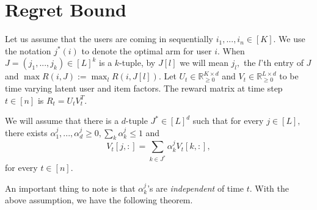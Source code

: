 \newcommand\myworries[1]{\textcolor{red}{#1}}

\section{Regret Bound}
Let us assume that the users are coming in sequentially $i_1,...,i_n \in [K].$ We use the notation $j^*(i)$ to denote the optimal arm for user $i$. When $J =(j_1,...,j_k) \in [L]^k$ is a $k$-tuple, by $J[l]$ we will mean $j_l,$ the $l$'th entry of $J$ and  $\max R(i, J) := \max_l R(i,J[l]).$ %
Let $U_t \in \mathbb{R}_{\geq 0}^{K \times d}$ and $V_t \in \mathbb{R}_{\geq 0}^{L \times d}$ to be time varying latent user and item factors.
 The reward matrix at time step $t \in [n]$ is $R_t = U_t V_t^T.$
\begin{assumption}
We will assume that there is a $d$-tuple $J^{*} \in [L]^d$ such that for every  $j \in [L],$ there exists $\alpha_1^j,...,\alpha_d^j \geq 0, \sum_k \alpha_k^j \leq 1$ and
$$ V_t[j,:] = \sum_{k \in J^*} \alpha_k^j V_t[k,:], $$
for every $t \in [n]$.
\end{assumption}
 An important thing to note is that $\alpha_k^j$'s are {\it independent} of time $t.$
With the above assumption, we have the following theorem.  

